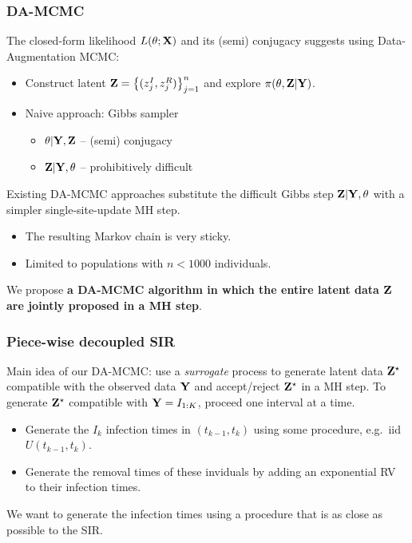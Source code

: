 \documentclass{beamer}
\begin{document}
\begin{frame} \frametitle{DA-MCMC}  
	
	The closed-form likelihood $L(\theta; \mathbf{X})$ and its (semi) conjugacy suggests using Data-Augmentation MCMC:
		\begin{itemize}
			\item Construct latent $\mathbf{Z} = \left\lbrace (z^I_j, z^R_j)\right\rbrace_{j=1}^{n}$ and explore $\pi(\theta, \mathbf{Z}|\mathbf{Y})$.
			\item Naive approach: Gibbs sampler
			\begin{itemize}
				\item $\theta|\mathbf{Y}, \mathbf{Z}$ -- (semi) conjugacy
				\item $\mathbf{Z}|\mathbf{Y},\theta$ -- prohibitively difficult
			\end{itemize}
		\end{itemize}
	\vfill
	Existing DA-MCMC approaches substitute the difficult Gibbs step $\mathbf{Z}|\mathbf{Y},\theta$ with a simpler single-site-update MH step.	
	\begin{itemize}
		\item The resulting Markov chain is very sticky.
		\item Limited to populations with $n<1000$ individuals.
	\end{itemize}
	\vfill
	We propose \textbf{a DA-MCMC algorithm in which the entire latent data $\mathbf{Z}$ are jointly proposed in a MH step}.
		
\end{frame}

\begin{frame} \frametitle{Piece-wise decoupled SIR}
		
	Main idea of our DA-MCMC: use a \textit{surrogate} process to generate latent data $\mathbf{Z}^\star$ compatible with the observed data $\mathbf{Y}$ and accept/reject $\mathbf{Z}^\star$ in a MH step.
	\vfill
	To generate $\mathbf{Z}^\star$ compatible with $\mathbf{Y} = I_{1:K}$, proceed one interval at a time.
	\begin{itemize}
		\item Generate the $I_k$ infection times in $(t_{k-1}, t_k)$ using some procedure, e.g.\ iid $U(t_{k-1}, t_k)$.
		\item Generate the removal times of these inviduals by adding an exponential RV to their infection times.		
	\end{itemize}
\vfill
	We want to generate the infection times using a procedure that is as close as possible to the SIR.
	
\end{frame}
\end{document}
